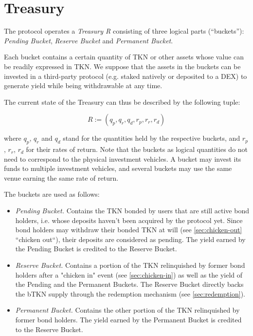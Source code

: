 \documentclass{article}
\begin{document}
\section{Treasury}
The protocol operates a \textit{Treasury R} consisting of three logical parts (“buckets”):  \textit{Pending Bucket}, \textit{Reserve Bucket} and \textit{Permanent Bucket}.

Each bucket contains a certain quantity of TKN or other assets whose value can be readily expressed in TKN. We suppose that the assets in the buckets can be invested in a third-party protocol (e.g. staked natively or deposited to a DEX) to generate yield while being withdrawable at any time. 

The current state of the Treasury can thus be described by the following tuple:

\begin{equation}
  \label{eq:treasury}
    R:=(q_p, q_r, q_d, r_p, r_r, r_d)
\end{equation}

where $q_p$, $q_r$ and $q_d$ stand for the quantities held by the respective buckets, and $r_p$, $r_r$, $r_d$ for their rates of return. Note that the buckets as logical quantities do not need to correspond to the physical investment vehicles. A bucket may invest its funds to multiple investment vehicles, and several buckets may use the same venue earning the same rate of return.

The buckets are used as follows:
\begin{itemize}
    \item \textit{Pending Bucket.} Contains the TKN bonded by users that are still active bond holders, i.e. whose deposits haven’t been acquired by the protocol yet. Since bond holders may withdraw their bonded TKN at will (see \ref{sec:chicken-out} “chicken out“), their deposits are considered as pending. The yield earned by the Pending Bucket is credited to the Reserve Bucket.
    \item \textit{Reserve Bucket.} Contains a portion of the TKN relinquished by former bond holders after a "chicken in" event (see \ref{sec:chicken-in}) as well as the yield of the Pending and the Permanent Buckets. The Reserve Bucket directly backs the bTKN supply through the redemption mechanism (see \ref{sec:redemption}).
    \item \textit{Permanent Bucket.} Contains the other portion of the TKN relinquished by former bond holders. The yield earned by the Permanent Bucket is credited to the Reserve Bucket.
\end{itemize}
\end{document}
